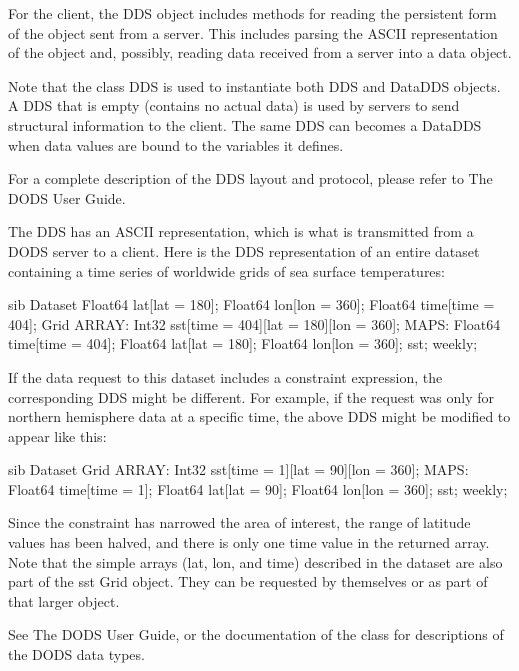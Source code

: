 \documentclass{dods-paper}
\begin{document}
For the client, the DDS object includes methods for reading the
persistent form of the object sent from a server. This includes
parsing the ASCII representation of the object and, possibly, reading
data received from a server into a data object.

Note that the class DDS is used to instantiate both DDS and DataDDS
objects. A DDS that is empty (contains no actual data) is used by
servers to send structural information to the client. The same DDS can
becomes a DataDDS when data values are bound to the variables it
defines.

For a complete description of the DDS layout and protocol, please
refer to The DODS User Guide.

The DDS has an ASCII representation, which is what is transmitted from
a DODS server to a client. Here is the DDS representation of an entire
dataset containing a time series of worldwide grids of sea surface
temperatures:

\begin{vcode}{sib}
  Dataset {
      Float64 lat[lat = 180];
      Float64 lon[lon = 360];
      Float64 time[time = 404];
      Grid {
        ARRAY:
           Int32 sst[time = 404][lat = 180][lon = 360];
        MAPS:
           Float64 time[time = 404];
           Float64 lat[lat = 180];
           Float64 lon[lon = 360];
      } sst;
  } weekly;
\end{vcode}
       
If the data request to this dataset includes a constraint expression,
the corresponding DDS might be different. For example, if the request
was only for northern hemisphere data at a specific time, the above
DDS might be modified to appear like this:

\begin{vcode}{sib}
  Dataset {
      Grid {
        ARRAY:
           Int32 sst[time = 1][lat = 90][lon = 360];
        MAPS:
           Float64 time[time = 1];
           Float64 lat[lat = 90];
           Float64 lon[lon = 360];
      } sst;
  } weekly;
\end{vcode}
       

Since the constraint has narrowed the area of interest, the range of
latitude values has been halved, and there is only one time value in
the returned array. Note that the simple arrays (lat, lon, and time)
described in the dataset are also part of the sst Grid object. They
can be requested by themselves or as part of that larger object.

See The DODS User Guide, or the documentation of the 
class for descriptions of the DODS data types.
\end{document}
